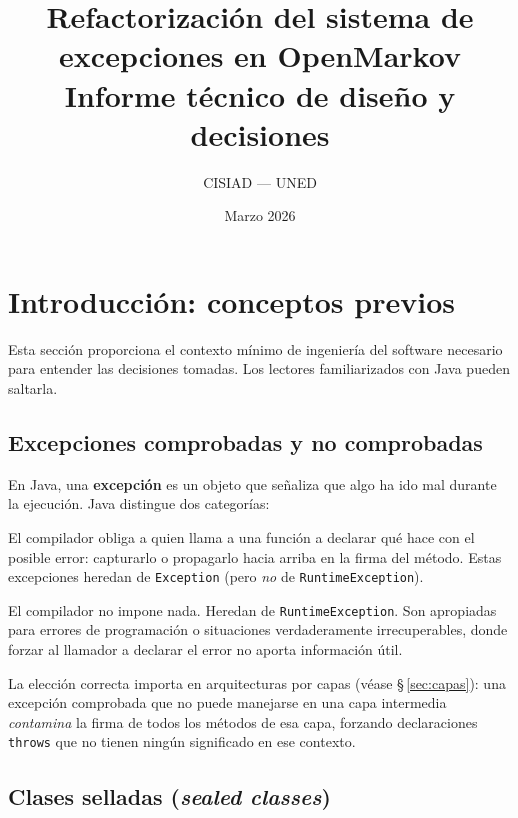 \documentclass[12pt,a4paper]{article}
\title{\textbf{Refactorización del sistema de excepciones en OpenMarkov}\\[0.5em]
\large Informe técnico de diseño y decisiones}
\author{CISIAD — UNED}
\date{Marzo 2026}
\begin{document}
\maketitle
\tableofcontents
\newpage

\section{Introducción: conceptos previos}
\label{sec:intro}

Esta sección proporciona el contexto mínimo de ingeniería del software necesario
para entender las decisiones tomadas. Los lectores familiarizados con Java pueden
saltarla.

\subsection{Excepciones comprobadas y no comprobadas}

En Java, una \textbf{excepción} es un objeto que señaliza que algo ha ido mal
durante la ejecución. Java distingue dos categorías:

\begin{description}[leftmargin=2em]
  \item[Comprobada (\textit{checked})] El compilador obliga a quien llama a una
    función a declarar qué hace con el posible error: capturarlo o propagarlo
    hacia arriba en la firma del método. Estas excepciones heredan de
    \texttt{Exception} (pero \emph{no} de \texttt{RuntimeException}).
  \item[No comprobada (\textit{unchecked})] El compilador no impone nada.
    Heredan de \texttt{RuntimeException}. Son apropiadas para errores de
    programación o situaciones verdaderamente irrecuperables, donde forzar al
    llamador a declarar el error no aporta información útil.
\end{description}

La elección correcta importa en arquitecturas por capas (véase §\,\ref{sec:capas}):
una excepción comprobada que no puede manejarse en una capa intermedia
\emph{contamina} la firma de todos los métodos de esa capa, forzando
declaraciones \texttt{throws} que no tienen ningún significado en ese contexto.

\subsection{Clases selladas (\textit{sealed classes})}
\end{document}
